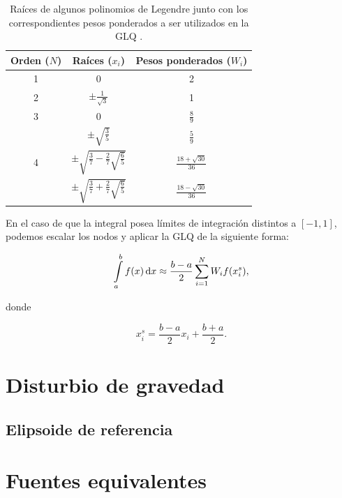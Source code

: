 \begin{table}
    \centering
    \caption{
        Raíces de algunos polinomios de Legendre junto con los correspondientes
        pesos ponderados a ser utilizados en la \ac{GLQ}
        \citep[][p.~392]{hildebrand1987}.
    }
    \begin{tabular}{ccc}
        \hline
        Orden ($N$) & Raíces ($x_i$)                                     & Pesos ponderados ($W_i$)    \\
        \hline
        1     & 0                                                        & 2                           \\
        2     & $\pm \frac{1}{\sqrt{3}}$                                 & 1                           \\
        3     & 0                                                        & $\frac{8}{9}$               \\
              & $\pm \sqrt{\frac{3}{5}}$                                 & $\frac{5}{9}$               \\
        4     & $\pm \sqrt{\frac{3}{7} - \frac{2}{7}\sqrt{\frac{6}{5}}}$ & $\frac{18 + \sqrt{30}}{36}$ \\
              & $\pm \sqrt{\frac{3}{7} + \frac{2}{7}\sqrt{\frac{6}{5}}}$ & $\frac{18 - \sqrt{30}}{36}$
    \end{tabular}
    \label{tab:legendre-roots}
\end{table}

En el caso de que la integral posea límites de integración distintos a
$[-1, 1]$, podemos escalar los nodos y aplicar la \ac{GLQ} de la siguiente
forma:

\begin{equation}
    \int\limits_a^b f(x) \mathop{}\!\textnormal{d} x \approx
        \frac{b - a}{2} \sum\limits_{i=1}^{N}
        W_i f(x_i^s),
\end{equation}

\noindent donde

\begin{equation}
    x_i^s = \frac{b - a}{2} x_i + \frac{b + a}{2}.
\end{equation}


\section{Disturbio de gravedad}

\subsection{Elipsoide de referencia}

\section{Fuentes equivalentes}
